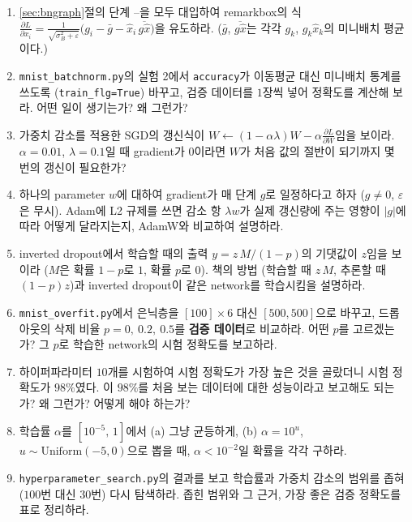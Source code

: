 \documentclass[11pt,a4paper]{article}
\newcommand{\pd}[2]{\frac{\partial #1}{\partial #2}}
\begin{document}
\begin{enumerate}[label=\arabic*.]
\item \ref{sec:bngraph}절의 단계 --을 모두 대입하여
remarkbox의 식 $\pd{L}{x_i}=\frac{1}{\sqrt{\sigma_B^2+\varepsilon}}\bigl(g_i-\bar g-\hat x_i\,\overline{g\hat x}\bigr)$을 유도하라.
($\bar g$, $\overline{g\hat x}$는 각각 $g_k$, $g_k\hat x_k$의 미니배치 평균이다.)

\item \texttt{mnist\_batchnorm.py}의 실험 2에서 \texttt{accuracy}가 이동평균 대신 미니배치 통계를 쓰도록
(\texttt{train\_flg=True}) 바꾸고, 검증 데이터를 $1$장씩 넣어 정확도를 계산해 보라.
어떤 일이 생기는가? 왜 그런가?

\item 가중치 감소를 적용한 SGD의 갱신식이 $W\leftarrow(1-\alpha\lambda)W-\alpha\pd{L}{W}$임을 보이라.
$\alpha=0.01$, $\lambda=0.1$일 때 gradient가 $0$이라면 $W$가 처음 값의 절반이 되기까지 몇 번의 갱신이 필요한가?

\item 하나의 parameter $w$에 대하여 gradient가 매 단계 $g$로 일정하다고 하자 ($g\neq0$, $\varepsilon$은 무시).
Adam에 L2 규제를 쓰면 감소 항 $\lambda w$가 실제 갱신량에 주는 영향이 $|g|$에 따라 어떻게 달라지는지,
AdamW와 비교하여 설명하라.

\item inverted dropout에서 학습할 때의 출력 $y=z\,M/(1-p)$의 기댓값이 $z$임을 보이라
($M$은 확률 $1-p$로 $1$, 확률 $p$로 $0$).
책의 방법 (학습할 때 $z\,M$, 추론할 때 $(1-p)z$)과 inverted dropout이 같은 network를 학습시킴을 설명하라.

\item \texttt{mnist\_overfit.py}에서 은닉층을 $[100]\times6$ 대신 $[500, 500]$으로 바꾸고,
드롭아웃의 삭제 비율 $p=0,\ 0.2,\ 0.5$를 \textbf{검증 데이터}로 비교하라.
어떤 $p$를 고르겠는가? 그 $p$로 학습한 network의 시험 정확도를 보고하라.

\item 하이퍼파라미터 $10$개를 시험하여 시험 정확도가 가장 높은 것을 골랐더니 시험 정확도가 $98\%$였다.
이 $98\%$를 처음 보는 데이터에 대한 성능이라고 보고해도 되는가? 왜 그런가? 어떻게 해야 하는가?

\item 학습률 $\alpha$를 $[10^{-5},\,1]$에서 (a) 그냥 균등하게, (b) $\alpha=10^{u}$, $u\sim\mathrm{Uniform}(-5,0)$으로 뽑을 때,
$\alpha<10^{-2}$일 확률을 각각 구하라.

\item \texttt{hyperparameter\_search.py}의 결과를 보고 학습률과 가중치 감소의 범위를 좁혀
($100$번 대신 $30$번) 다시 탐색하라. 좁힌 범위와 그 근거, 가장 좋은 검증 정확도를 표로 정리하라.

\end{enumerate}
\end{document}
